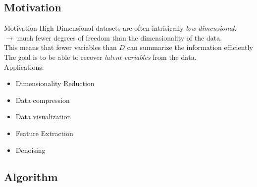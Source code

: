 \documentclass{beamer}
\begin{document}
\subsection{Motivation}


\begin{frame}{Motivation}
High Dimensional datasets are often intrisically \emph{low-dimensional}.\\

$\rightarrow$ much fewer degrees of freedom than the dimensionality of the data.\\
\vspace{0.25cm}
This means that fewer variables than $D$ can summarize the information efficiently \\
\vspace{0.25cm}
The goal is to be able to recover \emph{latent variables} from the data.\\
\vspace{.25cm}
Applications:

\begin{itemize}
\item Dimensionality Reduction
\item Data compression
\item Data visualization
\item Feature Extraction
\item Denoising
\end{itemize}

%
%
%


\end{frame}
\subsection{Algorithm}
\end{document}
